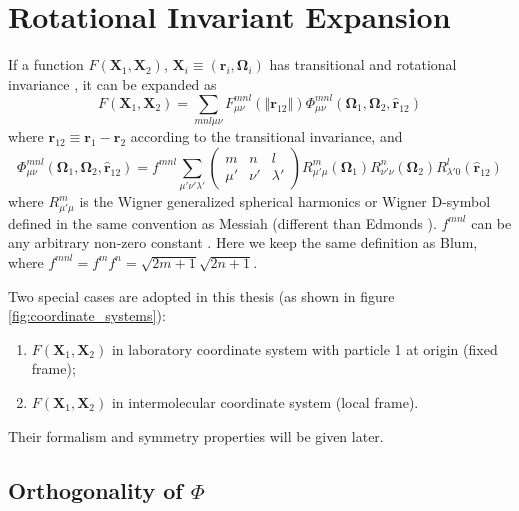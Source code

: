 
\chapter{Rotational Invariant Expansion\label{chpt:rotational-invariant-expansion}}

If a function $F(\mathbf{X}_{1},\mathbf{X}_{2})$, $\mathbf{X}_{i}\equiv(\mathbf{r}_{i},\mathbf{\Omega}_{i})$
has transitional and rotational invariance \citep{Blum_I}, it can
be expanded as
\begin{equation}
F(\mathbf{X}_{1},\mathbf{X}_{2})=\sum_{mnl\mu\nu}F_{\mu\nu}^{mnl}(\left\Vert \mathbf{r}_{12}\right\Vert )\Phi_{\mu\nu}^{mnl}(\mathbf{\Omega}_{1},\mathbf{\Omega}_{2},\mathbf{\hat{r}}_{12})\label{eq:pdf_on_rot_invar}
\end{equation}
where $\mathbf{r}_{12}\equiv\mathbf{r}_{1}-\mathbf{r}_{2}$ according
to the transitional invariance, and
\begin{equation}
\Phi_{\mu\nu}^{mnl}(\mathbf{\Omega}_{1},\mathbf{\Omega}_{2},\mathbf{\hat{r}}_{12})=f^{mnl}\sum_{\mu'\nu'\lambda'}\left(\begin{array}{ccc}
m & n & l\\
\mu' & \nu' & \lambda'
\end{array}\right)R_{\mu'\mu}^{m}(\mathbf{\Omega}_{1})R_{\nu'\nu}^{n}(\mathbf{\Omega}_{2})R_{\lambda'0}^{l}(\mathbf{\hat{r}}_{12})\label{eq:definition_rot_invar}
\end{equation}
where $R_{\mu'\mu}^{m}$ is the Wigner generalized spherical harmonics
or Wigner D-symbol defined in the same convention as Messiah \citep{Messiah}
(different than Edmonds \citep{Edmonds}). $f^{mnl}$ can be any arbitrary
non-zero constant \citep{Fries_Patey_1985}. Here we keep the same
definition as Blum, where $f^{mnl}=f^{m}f^{n}=\sqrt{2m+1}\sqrt{2n+1}$.

Two special cases are adopted in this thesis (as shown in figure \ref{fig:coordinate_systems}): 
\begin{enumerate}
\item $F(\mathbf{X}_{1},\mathbf{X}_{2})$ in laboratory coordinate system
with particle 1 at origin (fixed frame);
\item $F(\mathbf{X}_{1},\mathbf{X}_{2})$ in intermolecular coordinate system
(local frame). 
\end{enumerate}
Their formalism and symmetry properties will be given later.

\section{Orthogonality of $\Phi$}

